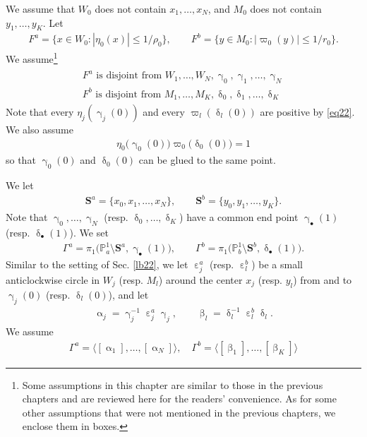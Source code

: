 \documentclass[11pt,b5paper,notitlepage]{article}
\theoremstyle{definition}
\theoremstyle{plain}
\newcommand{\bk}[1]{\langle {#1}\rangle}
\newcommand{\blt}{\bullet}
\newcommand{\Pbb}{\mathbb P}
\newcommand{\Sbf}{\mathbf{S}}
\numberwithin{equation}{subsection}
\begin{document}
We assume that $W_0$ does not contain $x_1,\dots,x_N$, and $M_0$ does not contain $y_1,\dots,y_K$. Let
\begin{align*}
F^a=\{x\in W_0:|\eta_0(x)|\leq 1/\rho_0\},\qquad F^b=\{y\in M_0:|\varpi_0(y)|\leq 1/r_0\}.	
\end{align*}
We assume\footnote{Some assumptions in this chapter are similar to those in the previous chapters and are reviewed here for the readers' convenience. As for some other assumptions that were not mentioned in the previous chapters, we enclose them in boxes.}
\begin{gather}\label{eq90}
\boxed{~\begin{array}{c}
F^a\text{ is disjoint from }	W_1,\dots,W_N,\upgamma_0,\upgamma_1,\dots,\upgamma_N\\[0.8ex]
F^b\text{ is disjoint from }M_1,\dots,M_K,\updelta_0,\updelta_1,\dots,\updelta_K
\end{array}~}
\end{gather}
Note that every $\eta_j(\upgamma_j(0))$ and every $\varpi_l(\updelta_l(0))$ are positive by \eqref{eq22}. We also assume
\begin{align}
\boxed{~\eta_0\big(\upgamma_0(0)\big)\varpi_0\big(\updelta_0(0)\big)=1~}	\label{eq54}
\end{align}
so that $\upgamma_0(0)$ and $\updelta_0(0)$ can be glued to the same point.




We let
\begin{align*}
\Sbf^a=\{x_0,x_1,\dots,x_N\},\qquad \Sbf^b=\{y_0,y_1,\dots,y_K\}.	
\end{align*}
Note that $\upgamma_0,\dots,\upgamma_N$ (resp. $\updelta_0,\dots,\updelta_K$) have a common end point $\upgamma_\blt(1)$ (resp. $\updelta_\blt(1)$). We set
\begin{align*}
\Gamma^a=\pi_1\big(\Pbb^1_a\setminus\Sbf^a,\upgamma_\blt(1)\big),\qquad \Gamma^b=\pi_1\big(\Pbb^1_b\setminus\Sbf^b,\updelta_\blt(1)\big).
\end{align*}
Similar to the setting of Sec. \ref{lb22}, we let $\upepsilon_j^a$ (resp. $\upepsilon_l^b$) be a small anticlockwise circle in $W_j$ (resp. $M_l$) around the center $x_j$ (resp. $y_l$) from and to $\upgamma_j(0)$ (resp. $\updelta_l(0)$), and let
\begin{align}
\upalpha_j=\upgamma_j^{-1}\upepsilon_j^a\upgamma_j,\qquad\upbeta_l=\updelta_l^{-1}\upepsilon_l^b\updelta_l.\label{eq56}
\end{align}
We assume
\begin{align}
\boxed{~\Gamma^a=\bk{[\upalpha_1],\dots,[\upalpha_N]},\quad\Gamma^b=\bk{[\upbeta_1],\dots,[\upbeta_K]}~}	\label{eq86}
\end{align}
\end{document}
